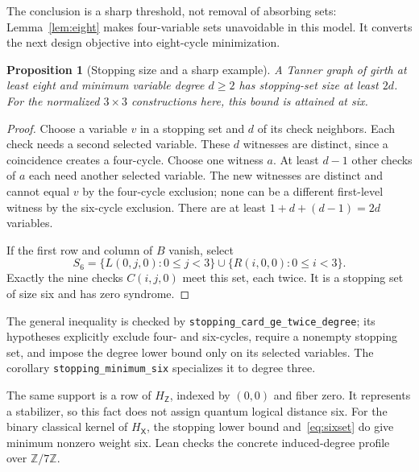 \documentclass[11pt]{article}
\newtheorem{proposition}[theorem]{Proposition}
\theoremstyle{definition}
\theoremstyle{remark}
\newcommand{\HX}{H_{\mathsf X}}
\newcommand{\HZ}{H_{\mathsf Z}}
\begin{document}
The conclusion is a sharp threshold, not removal of absorbing sets:
Lemma~\ref{lem:eight} makes four-variable sets unavoidable in this model.
It converts the next design objective into eight-cycle minimization.

\begin{proposition}[Stopping size and a sharp example]\label{prop:stopping}
A Tanner graph of girth at least eight and minimum variable degree
$d\ge2$ has stopping-set size at least $2d$. For the normalized
$3\times3$ constructions here, this bound is attained at six.
\end{proposition}
\begin{proof}
Choose a variable $v$ in a stopping set and $d$ of its check neighbors.
Each check needs a second selected variable. These $d$ witnesses are
distinct, since a coincidence creates a four-cycle. Choose one witness
$a$. At least $d-1$ other checks of $a$ each need another selected
variable. The new witnesses are distinct and cannot equal $v$ by the
four-cycle exclusion; none can be a different first-level witness by
the six-cycle exclusion. There are at least $1+d+(d-1)=2d$ variables.

If the first row and column of $B$ vanish, select
\begin{equation}\label{eq:sixset}
 S_6=\{L(0,j,0):0\le j<3\}\cup\{R(i,0,0):0\le i<3\}.
\end{equation}
Exactly the nine checks $C(i,j,0)$ meet this set, each twice.
It is a stopping set of size six and has zero syndrome.
\end{proof}

The general inequality is checked by
\texttt{stopping\_card\_ge\_twice\_degree}; its hypotheses explicitly
exclude four- and six-cycles, require a nonempty stopping set, and impose
the degree lower bound only on its selected variables. The corollary
\texttt{stopping\_minimum\_six} specializes it to degree three.

The same support is a row of $\HZ$, indexed by $(0,0)$ and fiber zero.
It represents a stabilizer, so this fact does not assign quantum logical
distance six. For the binary classical kernel of $\HX$, the stopping
lower bound and~\eqref{eq:sixset} do give minimum nonzero weight six.
Lean checks the concrete induced-degree profile over $\mathbb Z/7\mathbb Z$.
\end{document}
